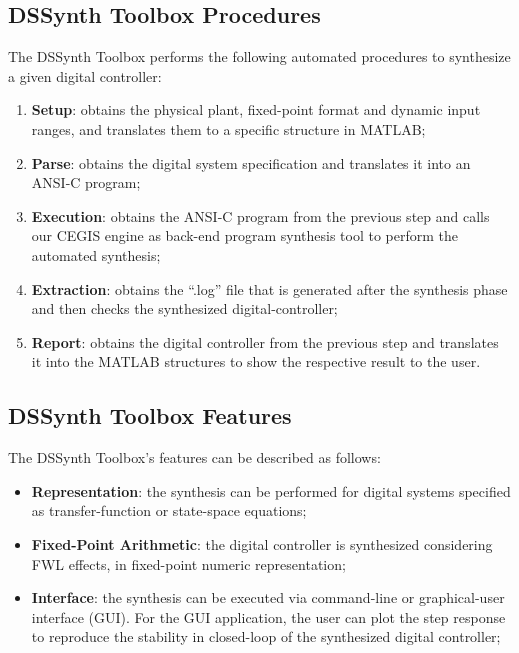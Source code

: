 \documentclass[sigconf]{acmart}
\newcommand\tool{{DSSynth Toolbox}\xspace}
\begin{document}
\subsection{\tool Procedures}

The \tool performs the following automated procedures 
to synthesize a given digital controller:

\begin{enumerate}
\item \textbf{Setup}: obtains the physical plant, fixed-point format 
and dynamic input ranges, and translates them to a specific structure in MATLAB;
\item \textbf{Parse}: obtains the digital system specification and translates 
it into an ANSI-C program;
\item \textbf{Execution}: obtains the ANSI-C program from the previous step 
and calls our CEGIS engine as back-end program synthesis tool to perform the automated synthesis;
\item \textbf{Extraction}: obtains the ``.log'' file that is generated 
after the synthesis phase and then checks the synthesized digital-controller;
\item \textbf{Report}: obtains the digital controller from the previous step 
and translates it into the MATLAB structures to show the respective result to the user.
\end{enumerate}

\subsection{\tool Features}

The \tool's features can be described as follows:

\begin{itemize}
\item \textbf{Representation}: the synthesis can be 
performed for digital systems specified as 
transfer-function or state-space equations;
\item \textbf{Fixed-Point Arithmetic}: the digital 
controller is synthesized considering FWL effects, 
in fixed-point numeric representation;
\item \textbf{Interface}: the synthesis can be executed 
via command-line or graphical-user interface (GUI). 
For the GUI application, the user can plot the step response 
to reproduce the stability in closed-loop of the synthesized digital controller;
\end{itemize}
\end{document}
